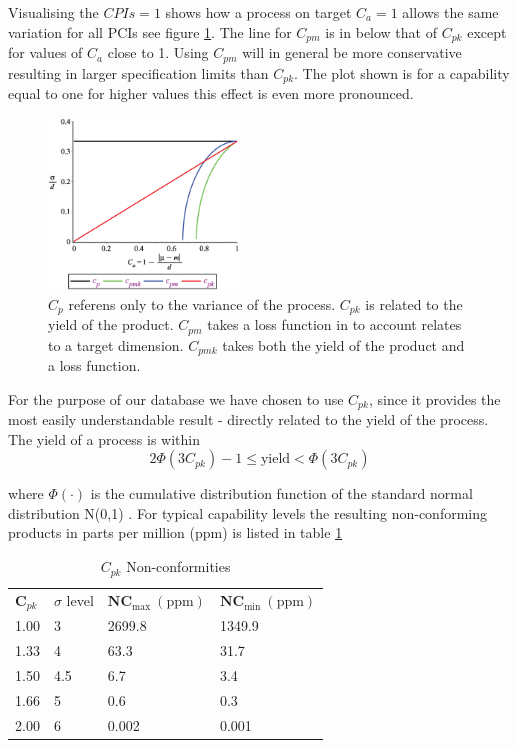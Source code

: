\documentclass[aip,amsmath, reprint, author-year]{revtex4-1}
\begin{document}
Visualising the $CPIs = 1$  shows how a process on target $C_a = 1$ allows the same variation for all PCIs see figure \ref{fig:CPI}. The line for $C_{pm}$ is in below that of $C_{pk}$ except for values of $C_a$ close to 1. 
Using $C_{pm}$ will in general be more conservative resulting in larger specification limits than $C_{pk}$. The plot shown is for a capability equal to one for higher values this effect is even more pronounced.

\begin{figure}
\includegraphics[width=0.45\textwidth]{graph_postscript_test.eps}
\caption{\label{fig:CPI} $C_p$ referens only to the variance of the process. $C_{pk}$ is related to the yield of the product. $C_{pm}$ takes a loss function in to account relates to a target dimension. $C_{pmk}$ takes both the yield of the product and a loss function. }
\end{figure}

For the purpose of our database we have chosen to use $C_{pk}$, since it provides the most easily understandable result - directly related to the yield of the process. The yield of a process is within
\begin{equation}
	2\Phi(3C_{pk})-1 \leq \text{yield} < \Phi(3C_{pk}) \nonumber
\end{equation}

where $\Phi(\cdot)$ is the cumulative distribution function of the standard normal distribution N(0,1) \citep{boyles1991taguchi}. For typical capability levels the resulting non-conforming products in parts per million (ppm) is listed in table \ref{tab:cpl_nc}

\begin{table}
\begin{ruledtabular}
\caption{\label{tab:cpl_nc} $C_{pk}$ Non-conformities}
\begin{tabular}{llll}
  $\mathbf{C}_{pk}$	& $\sigma$ level	& $\mathbf{NC_\mathrm{max}} \mathrm{\ (ppm)}$	&  $\mathbf{NC_\mathrm{min}} \mathrm{\ (ppm)}$	\\
  1.00	& 3		& 2699.8		& 1349.9		\\
  1.33 	& 4 		& 63.3		& 31.7 		\\
  1.50 	& 4.5 	& 6.7		& 3.4		\\
  1.66	& 5		& 0.6		& 0.3		\\
  2.00	& 6		& 0.002		& 0.001		\\
\end{tabular}%
\end{ruledtabular}
\end{table}
\end{document}
